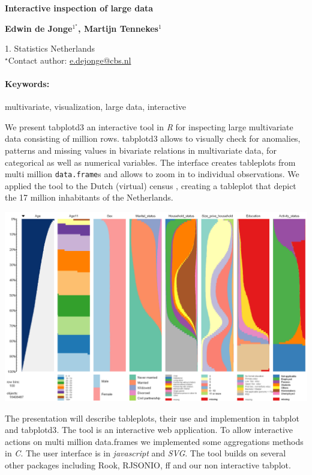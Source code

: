 \documentclass[11pt, a4paper]{article}
\newcommand{\pkg}[1]{{\normalfont\fontseries{b}\selectfont #1}}
\let\proglang=\textit
\let\code=\texttt
\renewcommand{\title}[1]{\begin{center}{\bf \LARGE #1}\end{center}}
\newcommand{\keywords}{\paragraph{Keywords:}}
\begin{document}
\pagestyle{empty}

\title{Interactive inspection of large data}

\begin{center}
  {\bf Edwin de Jonge$^{1^\star}$, Martijn Tennekes$^{1}$}
\end{center}

\begin{affiliations}
1. Statistics Netherlands\\[-2pt]
$^\star$Contact author: \href{mailto:e.dejonge@cbs.nl}{e.dejonge@cbs.nl}\\
\end{affiliations}

\keywords multivariate, visualization, large data, interactive

\vskip 0.8cm

We present \pkg{tabplotd3} an interactive tool in \proglang{R} for inspecting large multivariate data consisting of million rows. 
\pkg{tabplotd3} allows to visually check for anomalies, patterns and missing values in bivariate relations in multivariate data, for categorical as well as numerical variables. The interface creates tableplots \citep{malik10} from multi million \code{data.frame}s and allows to zoom in to individual observations. We applied the tool to the Dutch (virtual) census \citep{schulte}, creating a tableplot that depict the 17 million inhabitants of the Netherlands. \\ 

  \begin{center}
    \includegraphics[scale=0.6]{VT2008}
  \end{center}
 
The presentation will describe tableplots, their use and implemention in \pkg{tabplot} and \pkg{tabplotd3}. The tool is an interactive web application. To allow interactive actions on multi million data.frames we implemented some aggregations methods in \proglang{C}. The user interface is in \proglang{javascript} and \proglang{SVG}. 
The tool builds on several other packages including \pkg{Rook}, \pkg{RJSONIO}, \pkg{ff} and our non interactive \pkg{tabplot}. 



\end{document}
